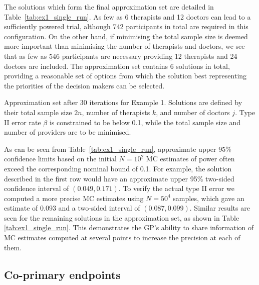 \documentclass[sagev, doublespace, Crown]{sagej}
\begin{document}
The solutions which form the final approximation set are detailed in Table~\ref{tab:ex1_single_run}. As few as 6 therapists and 12 doctors can lead to a sufficiently powered trial, although 742 participants in total are required in this configuration. On the other hand, if minimising the total sample size is deemed more important than minimising the number of therapists and doctors, we see that as few as 546 participants are necessary providing 12 therapists and 24 doctors are included. The approximation set contains 6 solutions in total, providing a reasonable set of options from which the solution best representing the priorities of the decision makers can be selected.

\begin{table}
\small\sf\centering
\caption{Approximation set after 30 iterations for Example 1. Solutions are defined by their total sample size $2n$, number of therapists $k$, and number of doctors $j$. Type II error rate $\beta$ is constrained to be below 0.1, while the total sample size and number of providers are to be minimised.}

\label{tab:ex1_single_run}
\end{table}

As can be seen from Table~\ref{tab:ex1_single_run}, approximate upper 95\% confidence limits based on the initial $N = 10^2$ MC estimates of power often exceed the corresponding nominal bound of 0.1. For example, the solution described in the first row would have an approximate upper 95\% two-sided confidence interval of $(0.049, 0.171)$. To verify the actual type II error we computed a more precise MC estimates  using $N = 50^4$ samples, which gave an estimate of 0.093 and a two-sided interval of $(0.087, 0.099)$. Similar results are seen for the remaining solutions in the approximation set, as shown in Table \ref{tab:ex1_single_run}. This demonstrates the GP's ability to share information of MC estimates computed at several points to increase the precision at each of them.


\subsection{Co-primary endpoints}
\end{document}
